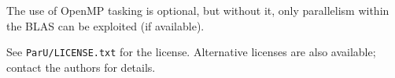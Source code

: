 \documentclass[12pt]{article}
\begin{document}
The use of OpenMP tasking is optional, but without it, only parallelism within
the BLAS can be exploited (if available).

See \verb'ParU/LICENSE.txt' for the license.  Alternative licenses are also
available; contact the authors for details.




\end{document}

